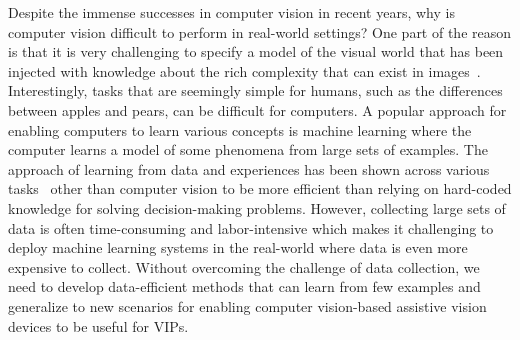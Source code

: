 Despite the immense successes in computer vision in recent years, why is computer vision difficult to perform in real-world settings? One part of the reason is that it is very challenging to specify a model of the visual world that has been injected with knowledge about the rich complexity that can exist in images~\cite{szeliski2010computer}. Interestingly, tasks that are seemingly simple for humans, such as the differences between apples and pears, can be difficult for computers. A popular approach for enabling computers to learn various concepts is machine learning where the computer learns a model of some phenomena from large sets of examples. The approach of learning from data and experiences has been shown across various tasks~\cite{akkaya2019solving, brown2020language, silver2016mastering} other than computer vision to be more efficient than relying on hard-coded knowledge for solving decision-making problems. However, collecting large sets of data is often time-consuming and labor-intensive which makes it challenging to deploy machine learning systems in the real-world where data is even more expensive to collect. Without overcoming the challenge of data collection, we need to develop data-efficient methods that can learn from few examples and generalize to new scenarios for enabling computer vision-based assistive vision devices to be useful for VIPs.   





